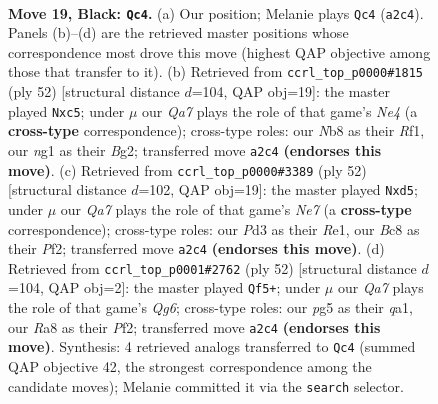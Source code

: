 \documentclass[11pt]{article}
\begin{document}
\clearpage

\begin{figure}[p]\centering
\begin{subfigure}{0.46\textwidth}\centering
\resizebox{\linewidth}{!}{%
\newchessgame
\chessboard[
  setfen={rnb1k3/pp6/6p1/4b1P1/8/3p4/q2B1K2/1R1Q1BN1 b q - 1 19},
  showmover=false,
  pgfstyle=straightmove, color=movearrow, markmove={a2-c4}
]}
\caption{}
\end{subfigure}\hfill
\begin{subfigure}{0.46\textwidth}\centering
\resizebox{\linewidth}{!}{%
\newchessgame
\chessboard[
  setfen={3r3k/pp4pp/4b3/2q1P3/3nN3/6P1/P3P1BP/5R1K w - - 0 27},
  showmover=false,
  pgfstyle=straightmove, color=movearrow, markmove={e4-c5}
]}
\caption{}
\end{subfigure}
\\[4pt]
\begin{subfigure}{0.46\textwidth}\centering
\resizebox{\linewidth}{!}{%
\newchessgame
\chessboard[
  setfen={1r6/p3Nkn1/8/P1pq4/3p1Bb1/8/1P3PP1/4R1K1 w - - 1 27},
  showmover=false,
  pgfstyle=straightmove, color=movearrow, markmove={e7-d5}
]}
\caption{}
\end{subfigure}\hfill
\begin{subfigure}{0.46\textwidth}\centering
\resizebox{\linewidth}{!}{%
\newchessgame
\chessboard[
  setfen={5b1r/3k4/p1p3Q1/4p1B1/8/8/1PPK1P1P/q7 w - - 4 27},
  showmover=false,
  pgfstyle=straightmove, color=movearrow, markmove={g6-f5}
]}
\caption{}
\end{subfigure}
\caption{\textbf{Move 19, Black: \texttt{Qc4}.} (a) Our position; Melanie plays \texttt{Qc4} (\texttt{a2c4}). Panels (b)--(d) are the retrieved master positions whose correspondence most drove this move (highest QAP objective among those that transfer to it). (b) Retrieved from \texttt{ccrl\_top\_p0000\#1815} (ply 52) [structural distance $d$=104, QAP obj=19]: the master played \texttt{Nxc5}; under $\mu$ our \emph{Qa7} plays the role of that game's \emph{Ne4} (a \textbf{cross-type} correspondence); cross-type roles: our \emph{N}b8 as their \emph{R}f1, our \emph{n}g1 as their \emph{B}g2; transferred move \texttt{a2c4} \textbf{(endorses this move)}. (c) Retrieved from \texttt{ccrl\_top\_p0000\#3389} (ply 52) [structural distance $d$=102, QAP obj=19]: the master played \texttt{Nxd5}; under $\mu$ our \emph{Qa7} plays the role of that game's \emph{Ne7} (a \textbf{cross-type} correspondence); cross-type roles: our \emph{P}d3 as their \emph{R}e1, our \emph{B}c8 as their \emph{P}f2; transferred move \texttt{a2c4} \textbf{(endorses this move)}. (d) Retrieved from \texttt{ccrl\_top\_p0001\#2762} (ply 52) [structural distance $d$=104, QAP obj=2]: the master played \texttt{Qf5+}; under $\mu$ our \emph{Qa7} plays the role of that game's \emph{Qg6}; cross-type roles: our \emph{p}g5 as their \emph{q}a1, our \emph{R}a8 as their \emph{P}f2; transferred move \texttt{a2c4} \textbf{(endorses this move)}. Synthesis: 4 retrieved analogs transferred to \texttt{Qc4} (summed QAP objective 42, the strongest correspondence among the candidate moves); Melanie committed it via the \texttt{search} selector.}
\label{fig:thought-m37}
\end{figure}
\end{document}

